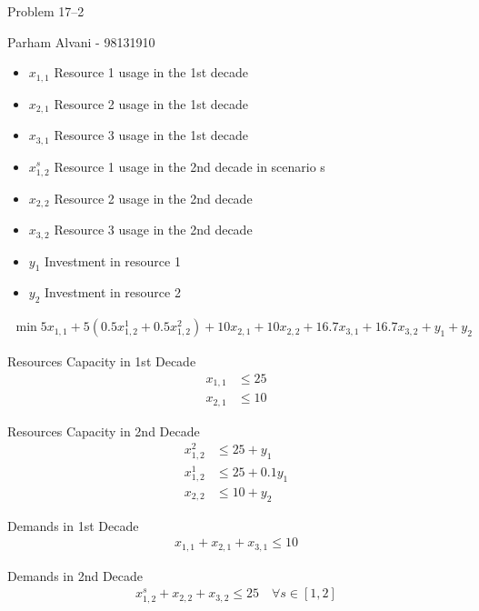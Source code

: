 \documentclass{article}
\begin{document}
{\Large Problem 17--2
        \hfill}

\begin{center}
{\Large Parham Alvani - 98131910}
\end{center}
\vspace{0.05in}

\begin{itemize}
        \item \(x_{1, 1}\) Resource 1 usage in the 1st decade
        \item \(x_{2, 1}\) Resource 2 usage in the 1st decade
        \item \(x_{3, 1}\) Resource 3 usage in the 1st decade
        \item \(x_{1, 2}^s\) Resource 1 usage in the 2nd decade in scenario s
        \item \(x_{2, 2}\) Resource 2 usage in the 2nd decade
        \item \(x_{3, 2}\) Resource 3 usage in the 2nd decade
        \item \(y_1\) Investment in resource 1
        \item \(y_2\) Investment in resource 2
\end{itemize}

\begin{align*}
        \min 5x_{1, 1} + 5(0.5 x_{1, 2}^1 + 0.5 x_{1, 2}^2) + 10x_{2, 1} + 10x_{2, 2} + 16.7x_{3, 1} + 16.7x_{3, 2} + y_1 + y_2
\end{align*}

Resources Capacity in 1st Decade
\begin{align*}
        x_{1, 1} &\le 25 \\
        x_{2, 1} &\le 10
\end{align*}

Resources Capacity in 2nd Decade
\begin{align*}
        x_{1, 2}^2 &\le 25 + y_{1}\\
        x_{1, 2}^1 &\le 25 + 0.1y_{1}\\
        x_{2, 2} &\le 10 + y_{2}
\end{align*}

Demands in 1st Decade
\begin{align*}
        x_{1, 1} + x_{2, 1} + x_{3, 1} \le 10
\end{align*}

Demands in 2nd Decade
\begin{align*}
        x_{1, 2}^s + x_{2, 2} + x_{3, 2} \le 25 \quad \forall s \in [1, 2]
\end{align*}
\end{document}
